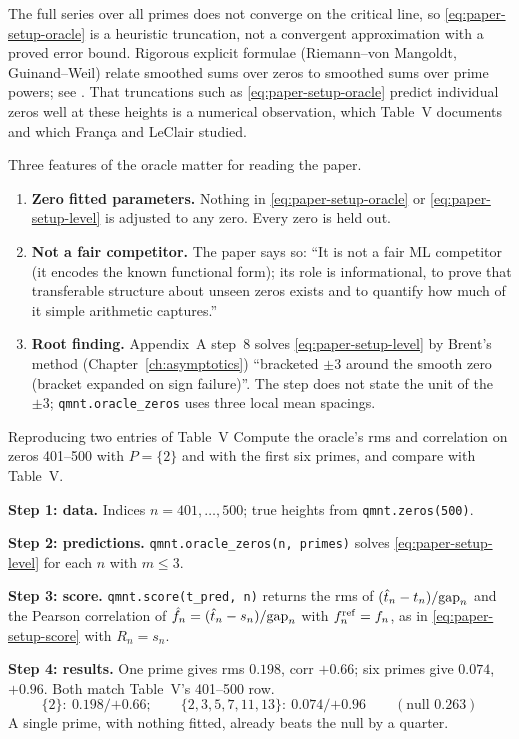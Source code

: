 \begin{beyond}
The full series over all primes does not converge on the critical line, so \eqref{eq:paper-setup-oracle} is a heuristic truncation, not a convergent approximation with a proved error bound. Rigorous explicit formulae (Riemann--von Mangoldt, Guinand--Weil) relate smoothed sums over zeros to smoothed sums over prime powers; see \cite{edwards,titchmarsh,davenport}. That truncations such as \eqref{eq:paper-setup-oracle} predict individual zeros well at these heights is a numerical observation, which Table~V documents and which Fran\c{c}a and LeClair \cite{francaleclair,leclair} studied.
\end{beyond}

Three features of the oracle matter for reading the paper.
\begin{enumerate}
\item \textbf{Zero fitted parameters.} Nothing in \eqref{eq:paper-setup-oracle} or \eqref{eq:paper-setup-level} is adjusted to any zero. Every zero is held out.
\item \textbf{Not a fair competitor.} The paper says so: ``It is not a fair ML competitor (it encodes the known functional form); its role is informational, to prove that transferable structure about unseen zeros exists and to quantify how much of it simple arithmetic captures.''
\item \textbf{Root finding.} Appendix~A step~8 solves \eqref{eq:paper-setup-level} by Brent's method (Chapter~\ref{ch:asymptotics}) ``bracketed $\pm3$ around the smooth zero (bracket expanded on sign failure)''. The step does not state the unit of the $\pm3$; \texttt{qmnt.oracle\_zeros} uses three local mean spacings.
\end{enumerate}

\begin{sample}{Reproducing two entries of Table~V}
Compute the oracle's rms and correlation on zeros 401--500 with $P=\{2\}$ and with the first six primes, and compare with Table~V.

\textbf{Step 1: data.} Indices $n=401,\dots,500$; true heights from \texttt{qmnt.zeros(500)}.

\textbf{Step 2: predictions.} \texttt{qmnt.oracle\_zeros(n, primes)} solves \eqref{eq:paper-setup-level} for each $n$ with $m\le3$.

\textbf{Step 3: score.} \texttt{qmnt.score(t\_pred, n)} returns the rms of $(\hat t_n-t_n)/\mathrm{gap}_n$ and the Pearson correlation of $\hat f_n=(\hat t_n-s_n)/\mathrm{gap}_n$ with $f^{\rm ref}_n=f_n$, as in \eqref{eq:paper-setup-score} with $R_n=s_n$.

\textbf{Step 4: results.} One prime gives rms $0.198$, corr $+0.66$; six primes give $0.074$, $+0.96$. Both match Table~V's 401--500 row.
\[
\boxed{\{2\}:\ 0.198/{+0.66};\qquad \{2,3,5,7,11,13\}:\ 0.074/{+0.96}\qquad(\text{null }0.263)}
\]
A single prime, with nothing fitted, already beats the null by a quarter.
\end{sample}

